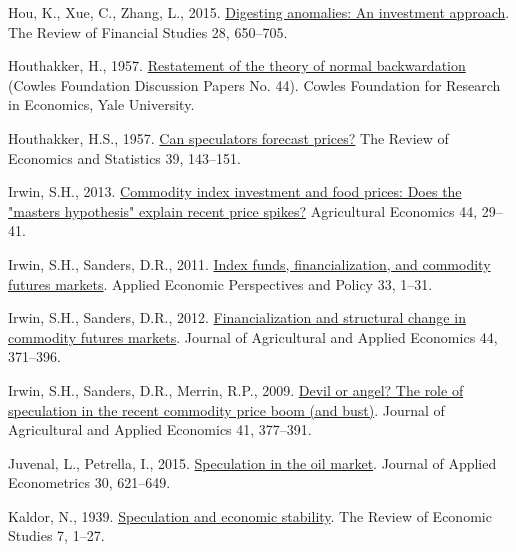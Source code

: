 \documentclass[]{elsarticle} %
\newlength{\cslhangindent}
\newlength{\cslentryspacingunit} %
\newenvironment{CSLReferences}[2] %
 {%
  \setlength{\parindent}{0pt}
  \ifodd #1
  \let\oldpar\par
  \def\par{\hangindent=\cslhangindent\oldpar}
  \fi
  \setlength{\parskip}{#2\cslentryspacingunit}
 }%
 {}
\begin{document}
\begin{CSLReferences}{1}{0}
\leavevmode{}%
Hou, K., Xue, C., Zhang, L., 2015. \href{https://doi.org/10.1093/rfs/hhu068}{Digesting anomalies: An investment approach}. The Review of Financial Studies 28, 650--705.

\leavevmode{}%
Houthakker, H., 1957. \href{https://EconPapers.repec.org/RePEc:cwl:cwldpp:44}{Restatement of the theory of normal backwardation} (Cowles Foundation Discussion Papers No. 44). Cowles Foundation for Research in Economics, Yale University.

\leavevmode{}%
Houthakker, H.S., 1957. \href{https://doi.org/10.2307/1928531}{Can speculators forecast prices?} The Review of Economics and Statistics 39, 143--151.

\leavevmode{}%
Irwin, S.H., 2013. \href{https://doi.org/10.1111/agec.12048}{Commodity index investment and food prices: Does the "masters hypothesis" explain recent price spikes?} Agricultural Economics 44, 29--41.

\leavevmode{}%
Irwin, S.H., Sanders, D.R., 2011. \href{https://doi.org/10.1093/aepp/ppq032}{Index funds, financialization, and commodity futures markets}. Applied Economic Perspectives and Policy 33, 1--31.

\leavevmode{}%
Irwin, S.H., Sanders, D.R., 2012. \href{https://doi.org/10.1017/S1074070800000481}{Financialization and structural change in commodity futures markets}. Journal of Agricultural and Applied Economics 44, 371--396.

\leavevmode{}%
Irwin, S.H., Sanders, D.R., Merrin, R.P., 2009. \href{https://doi.org/10.1017/S1074070800002856}{Devil or angel? The role of speculation in the recent commodity price boom (and bust)}. Journal of Agricultural and Applied Economics 41, 377--391.

\leavevmode{}%
Juvenal, L., Petrella, I., 2015. \href{https://doi.org/10.1002/jae.2388}{Speculation in the oil market}. Journal of Applied Econometrics 30, 621--649.

\leavevmode{}%
Kaldor, N., 1939. \href{https://doi.org/10.2307/2967593}{{Speculation and economic stability}}. The Review of Economic Studies 7, 1--27.


\end{CSLReferences}
\end{document}
